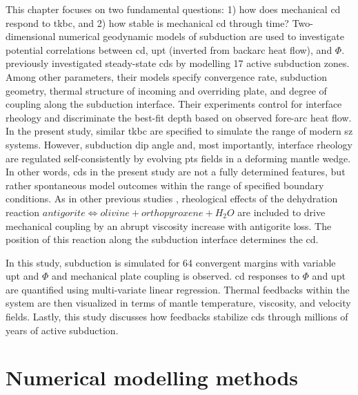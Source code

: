 This chapter focuses on two fundamental questions: 1) how does mechanical \gls{cd} respond to \gls{tkbc}, and 2) how stable is mechanical \gls{cd} through time? Two-dimensional numerical geodynamic models of subduction are used to investigate potential correlations between \gls{cd}, \gls{upt} (inverted from backarc heat flow), and \(\Phi\). \citet{Wada2009} previously investigated steady-state \glspl{cd} by modelling 17 active subduction zones. Among other parameters, their models specify convergence rate, subduction geometry, thermal structure of incoming and overriding plate, and degree of coupling along the subduction interface. Their experiments control for interface rheology and discriminate the best-fit depth based on observed fore-arc heat flow. In the present study, similar \gls{tkbc} are specified to simulate the range of modern \gls{sz} systems. However, subduction dip angle and, most importantly, interface rheology are regulated self-consistently by evolving \gls{pts} fields in a deforming mantle wedge. In other words, \glspl{cd} in the present study are not a fully determined features, but rather spontaneous model outcomes within the range of specified boundary conditions. As in other previous studies \citep[e.g.,][]{Ruh2015}, rheological effects of the dehydration reaction \(antigorite \allowbreak \Leftrightarrow olivine + orthopyroxene + H_{2}O\) are included to drive mechanical coupling by an abrupt viscosity increase with antigorite loss. The position of this reaction along the subduction interface determines the \gls{cd}.

In this study, subduction is simulated for 64 convergent margins with variable \gls{upt} and \(\Phi\) and mechanical plate coupling is observed. \Gls{cd} responses to \(\Phi\) and \gls{upt} are quantified using multi-variate linear regression. Thermal feedbacks within the system are then visualized in terms of mantle temperature, viscosity, and velocity fields. Lastly, this study discusses how feedbacks stabilize \glspl{cd} through millions of years of active subduction.

\hypertarget{numerical-modelling-methods}{%
\section{Numerical modelling methods}\label{numerical-modelling-methods}}

